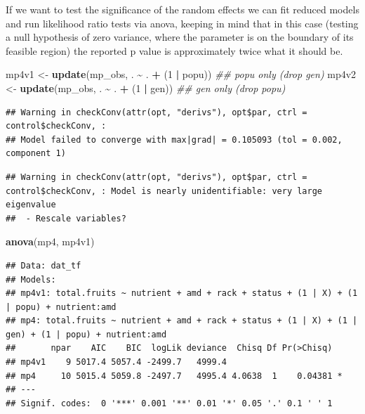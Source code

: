 \documentclass[
  12pt,
]{book}
\newenvironment{Shaded}{\begin{snugshade}}{\end{snugshade}}
\newcommand{\CommentTok}[1]{\textcolor[rgb]{0.56,0.35,0.01}{\textit{#1}}}
\newcommand{\DecValTok}[1]{\textcolor[rgb]{0.00,0.00,0.81}{#1}}
\newcommand{\KeywordTok}[1]{\textcolor[rgb]{0.13,0.29,0.53}{\textbf{#1}}}
\newcommand{\NormalTok}[1]{#1}
\newcommand{\OperatorTok}[1]{\textcolor[rgb]{0.81,0.36,0.00}{\textbf{#1}}}
\newcommand{\StringTok}[1]{\textcolor[rgb]{0.31,0.60,0.02}{#1}}
\begin{document}
If we want to test the significance of the random effects we can fit reduced models and run likelihood ratio tests via anova, keeping in mind that in this case (testing a null hypothesis of zero variance, where the parameter is on the boundary of its feasible region) the reported p value is approximately twice what it should be.

\begin{Shaded}
\begin{Highlighting}[]
\NormalTok{mp4v1 \textless{}{-}}\StringTok{ }\KeywordTok{update}\NormalTok{(mp\_obs, . }\OperatorTok{\textasciitilde{}}\StringTok{ }\NormalTok{. }\OperatorTok{+}\StringTok{ }\NormalTok{(}\DecValTok{1} \OperatorTok{|}\StringTok{ }\NormalTok{popu)) }\CommentTok{\#\# popu only (drop gen)}
\NormalTok{mp4v2 \textless{}{-}}\StringTok{ }\KeywordTok{update}\NormalTok{(mp\_obs, . }\OperatorTok{\textasciitilde{}}\StringTok{ }\NormalTok{. }\OperatorTok{+}\StringTok{ }\NormalTok{(}\DecValTok{1} \OperatorTok{|}\StringTok{ }\NormalTok{gen)) }\CommentTok{\#\# gen only (drop popu)}
\end{Highlighting}
\end{Shaded}

\begin{verbatim}
## Warning in checkConv(attr(opt, "derivs"), opt$par, ctrl = control$checkConv, :
## Model failed to converge with max|grad| = 0.105093 (tol = 0.002, component 1)
\end{verbatim}

\begin{verbatim}
## Warning in checkConv(attr(opt, "derivs"), opt$par, ctrl = control$checkConv, : Model is nearly unidentifiable: very large eigenvalue
##  - Rescale variables?
\end{verbatim}

\begin{Shaded}
\begin{Highlighting}[]
\KeywordTok{anova}\NormalTok{(mp4, mp4v1)}
\end{Highlighting}
\end{Shaded}

\begin{verbatim}
## Data: dat_tf
## Models:
## mp4v1: total.fruits ~ nutrient + amd + rack + status + (1 | X) + (1 | popu) + nutrient:amd
## mp4: total.fruits ~ nutrient + amd + rack + status + (1 | X) + (1 | gen) + (1 | popu) + nutrient:amd
##       npar    AIC    BIC  logLik deviance  Chisq Df Pr(>Chisq)  
## mp4v1    9 5017.4 5057.4 -2499.7   4999.4                       
## mp4     10 5015.4 5059.8 -2497.7   4995.4 4.0638  1    0.04381 *
## ---
## Signif. codes:  0 '***' 0.001 '**' 0.01 '*' 0.05 '.' 0.1 ' ' 1
\end{verbatim}
\end{document}
